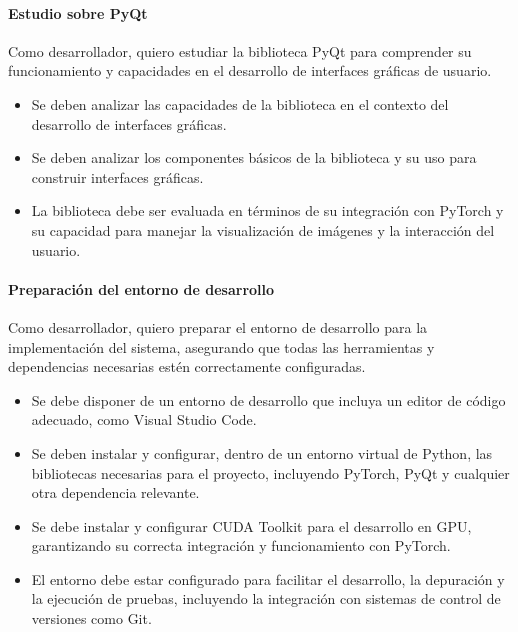 \newpage

\paragraph{Estudio sobre PyQt} \label{hist:estudio_pyqt}
Como desarrollador, quiero estudiar la biblioteca PyQt para comprender su funcionamiento y capacidades en el desarrollo
de interfaces gráficas de usuario.


\begin{itemize}[noitemsep]
	\item Se deben analizar las capacidades de la biblioteca en el contexto del desarrollo de interfaces gráficas.
	\item Se deben analizar los componentes básicos de la biblioteca y su uso para construir interfaces gráficas.
	\item La biblioteca debe ser evaluada en términos de su integración con PyTorch y su capacidad para manejar la visualización de imágenes y la interacción del usuario.
\end{itemize}

\paragraph{Preparación del entorno de desarrollo} \label{hist:preparacion_entorno_desarrollo}
Como desarrollador, quiero preparar el entorno de desarrollo para la implementación del sistema, asegurando que todas las herramientas 
y dependencias necesarias estén correctamente configuradas.

\begin{itemize}[noitemsep]
	\item Se debe disponer de un entorno de desarrollo que incluya un editor de código adecuado, como Visual Studio Code.
	\item Se deben instalar y configurar, dentro de un entorno virtual de Python, las bibliotecas necesarias para el proyecto, incluyendo PyTorch, PyQt y cualquier otra dependencia relevante.
	\item Se debe instalar y configurar CUDA Toolkit para el desarrollo en GPU, garantizando su correcta integración y funcionamiento con PyTorch.
	\item El entorno debe estar configurado para facilitar el desarrollo, la depuración y la ejecución de pruebas, incluyendo la integración con sistemas de control de versiones como Git.
\end{itemize}

